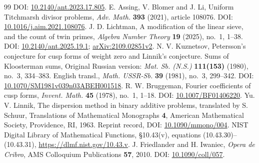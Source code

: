 \documentclass{amsart}
\numberwithin{equation}{section}
\theoremstyle{definition}
\theoremstyle{plain}
\begin{document}
\begin{thebibliography}{99}
DOI: \href{https://doi.org/10.2140/ant.2023.17.805}{10.2140/ant.2023.17.805}.
 E. Assing, V. Blomer and J. Li,
Uniform Titchmarsh divisor problems,
\emph{Adv. Math.} \textbf{393} (2021), article 108076.
DOI: \href{https://doi.org/10.1016/j.aim.2021.108076}{10.1016/j.aim.2021.108076}.
 J. D. Lichtman,
A modification of the linear sieve, and the count of twin primes,
\emph{Algebra Number Theory} \textbf{19} (2025), no.~1, 1--38.
DOI: \href{https://doi.org/10.2140/ant.2025.19.1}{10.2140/ant.2025.19.1};
\href{https://arxiv.org/abs/2109.02851v2}{arXiv:2109.02851v2}.
 N. V. Kuznetsov,
Petersson's conjecture for cusp forms of weight zero and Linnik's conjecture.
Sums of Kloosterman sums,
Original Russian version: \emph{Mat. Sb. (N.S.)} \textbf{111(153)}
(1980), no.~3, 334--383.
English transl., \emph{Math. USSR-Sb.} \textbf{39} (1981), no.~3, 299--342.
DOI: \href{https://doi.org/10.1070/SM1981v039n03ABEH001518}{10.1070/SM1981v039n03ABEH001518}.
 R. W. Bruggeman,
Fourier coefficients of cusp forms,
\emph{Invent. Math.} \textbf{45} (1978), no.~1, 1--18.
DOI: \href{https://doi.org/10.1007/BF01406220}{10.1007/BF01406220}.
 Yu. V. Linnik,
The dispersion method in binary additive problems,
translated by S. Schuur, Translations of Mathematical Monographs \textbf{4},
American Mathematical Society, Providence, RI, 1963.
Reprint record, DOI: \href{https://doi.org/10.1090/mmono/004}{10.1090/mmono/004}.
 NIST Digital Library of Mathematical Functions,
\S10.43(v), equations (10.43.30)--(10.43.31),
\url{https://dlmf.nist.gov/10.43.v}.
 J. Friedlander and H. Iwaniec,
\emph{Opera de Cribro}, AMS Colloquium Publications \textbf{57}, 2010.
DOI: \href{https://doi.org/10.1090/coll/057}{10.1090/coll/057}.
\end{thebibliography}
\end{document}
